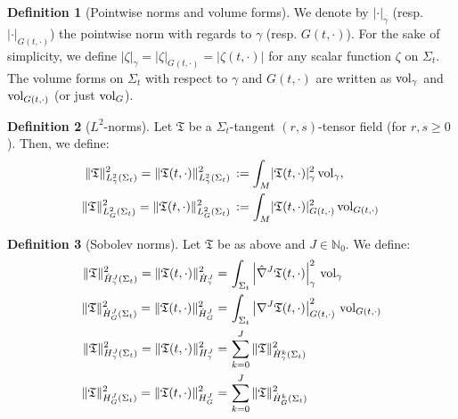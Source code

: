 \documentclass[11pt,leqno,textwidth=10cm]{amsart}
\numberwithin{equation}{section}
\theoremstyle{definition}
\newtheorem{definition}{Definition}[section]
\theoremstyle{plain}
\newcommand{\1}{\mathbbm{1}}
\newcommand{\N}{\mathbb{N}}
\newcommand{\vol}[1]{{\text{\normalfont{vol}}}_{#1}}
\newcommand{\nabhat}{\hat{\nabla}}
\begin{document}
\begin{definition}[Pointwise norms and volume forms] \label{def:pw-stuff}
We denote by $\lvert\cdot\rvert_\gamma$ (resp. $\lvert\cdot\rvert_{G(t,\cdot)}$) the pointwise norm with regards to $\gamma$ (resp. $G(t,\cdot)$). For the sake of simplicity, we define $\lvert\zeta\rvert_\gamma=\lvert\zeta\rvert_{G(t,\cdot)}=\lvert\zeta(t,\cdot)\rvert$ for any scalar function $\zeta$ on $\Sigma_t$. The volume forms on $\Sigma_t$ with respect to $\gamma$ and $G(t,\cdot)$ are written as $\vol{\gamma}$ and $\vol{G(t,\cdot)}$ (or just $\vol{G}$).
\end{definition}

\begin{definition}[$L^2$-norms] Let $\mathfrak{T}$ be a $\Sigma_t$-tangent $(r,s)$-tensor field (for $r,s\geq 0$). Then, we define:
\begin{subequations}
\begin{align}
\|\mathfrak{T}\|_{L^2_\gamma(\Sigma_t)}^2=\|\mathfrak{T}(t,\cdot)\|_{L^2_\gamma(\Sigma_t)}^2&\,:=\int_M \lvert\mathfrak{T}(t,\cdot)\rvert_\gamma^2\,\vol{\gamma},\\
\|\mathfrak{T}\|_{L^2_G(\Sigma_t)}^2=\|\mathfrak{T}(t,\cdot)\|_{L^2_G(\Sigma_t)}^2&\,:=\int_M\lvert\mathfrak{T}(t,\cdot)\rvert_{G(t,\cdot)}^2\,\vol{G(t,\cdot)}\,
\end{align} 
\end{subequations}
\end{definition}

\begin{definition}[Sobolev norms]\label{def:sob-norms} Let $\mathfrak{T}$ be as above and $J\in\N_0$. We define:
\begin{subequations}
\begin{align}
\|\mathfrak{T}\|_{\dot{H}^J_\gamma(\Sigma_t)}^2=\|\mathfrak{T}(t,\cdot)\|_{\dot{H}^J_\gamma}^2=&\,\int_{\Sigma_t}\left\lvert\nabhat^J\mathfrak{T}(t,\cdot)\right\rvert_\gamma^2\,\vol{\gamma}\\
\|\mathfrak{T}\|_{\dot{H}^J_G(\Sigma_t)}^2=\|\mathfrak{T}(t,\cdot)\|_{\dot{H}^J_G}^2=&\,\int_{\Sigma_t}\left\lvert\nabla^J\mathfrak{T}(t,\cdot)\right\rvert_{G(t,\cdot)}^2\,\vol{G(t,\cdot)}\\
\|\mathfrak{T}\|_{H^J_\gamma(\Sigma_t)}^2=\|\mathfrak{T}(t,\cdot)\|_{H^J_\gamma}^2=&\,\sum_{k=0}^J\|\mathfrak{T}\|_{\dot{H}^k_\gamma(\Sigma_t)}^2\\
\|\mathfrak{T}\|_{H^J_G(\Sigma_t)}^2=\|\mathfrak{T}(t,\cdot)\|_{H^J_G}^2=&\,\sum_{k=0}^J\|\mathfrak{T}\|_{\dot{H}^k_G(\Sigma_t)}^2
\end{align}
\end{subequations}
\end{definition}
\end{document}

